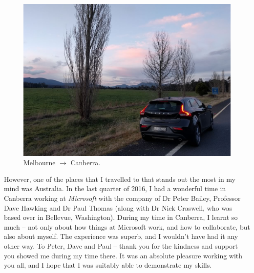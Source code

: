 \begin{preamble}
\renewcommand{\figurename}{Picture}
\begin{figure}
    \begin{center}
    \vspace*{-9mm}
    \includegraphics[width=1\textwidth]{figures/ch0-aus.jpg}
    \end{center}
    \vspace*{-6mm}
    \caption[]{Melbourne $\rightarrow$ Canberra.}
    \label{fig:acks_australia}
\end{figure}
\renewcommand{\figurename}{Figure}

However, one of the places that I travelled to that stands out the most in my mind was Australia. In the last quarter of 2016, I had a wonderful time in Canberra working at \emph{Microsoft} with the company of Dr Peter Bailey, Professor Dave Hawking and Dr Paul Thomas (along with Dr Nick Craswell, who was based over in Bellevue, Washington). During my time in Canberra, I learnt so much -- not only about how things at Microsoft work, and how to collaborate, but also about myself. The experience was superb, and I wouldn't have had it any other way. To Peter, Dave and Paul -- thank you for the kindness and support you showed me during my time there. It was an absolute pleasure working with you all, and I hope that I was suitably able to demonstrate my skills.


\end{preamble}
